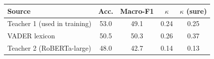 \begin{tabular}{lcccc}
\toprule
Source & Acc. & Macro-F1 & $\kappa$ & $\kappa$ (sure) \\
\midrule
Teacher 1 (used in training) & 53.0 & 49.1 & 0.24 & 0.25 \\
VADER lexicon & 50.5 & 50.3 & 0.26 & 0.37 \\
Teacher 2 (RoBERTa-large) & 48.0 & 42.7 & 0.14 & 0.13 \\
\bottomrule
\end{tabular}
